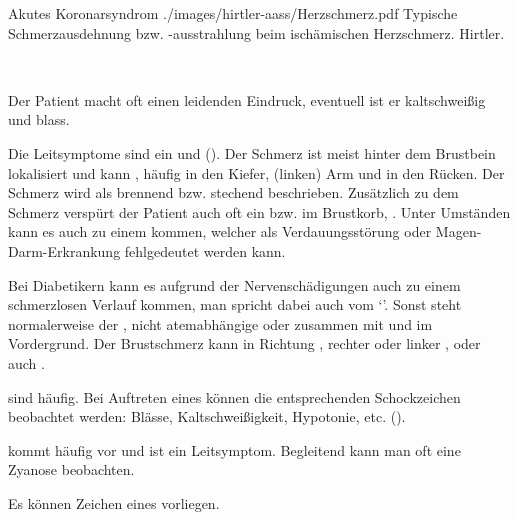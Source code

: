 {Akutes Koronarsyndrom}
{}
{}
{./images/hirtler-aass/Herzschmerz.pdf}
{Typische Schmerzausdehnung bzw. -ausstrahlung beim ischämischen
Herzschmerz.}
{Hirtler.}




{\TxABCDE}
{~
\begin{ABCDEText}
  \item[\ABCDE{3}]  Der Patient macht oft einen leidenden
  Eindruck, eventuell ist er kaltschweißig und blass.
  \item[\ABCDE{4}] Die Leitsymptome sind ein  und 
  ().
  Der Schmerz ist meist hinter dem Brustbein lokalisiert und
  kann , häufig in den Kiefer, (linken) Arm
  und in den Rücken. Der Schmerz wird als brennend bzw.
  stechend beschrieben. Zusätzlich zu dem Schmerz verspürt
  der Patient auch oft ein  bzw. 
  im Brustkorb, .
  Unter Umständen kann es auch zu einem
   kommen, welcher als
  Verdauungsstörung oder Magen-Darm-Erkrankung fehlgedeutet
  werden kann.
  
  Bei Diabetikern kann es aufgrund der Nervenschädigungen
  auch zu einem schmerzlosen Verlauf kommen, man spricht
  dabei auch vom \enquote*{}.
  Sonst steht normalerweise der ,
  nicht atemabhängige  oder
   zusammen mit  und
   im Vordergrund. Der Brustschmerz kann in
  Richtung , rechter oder linker ,
   oder auch  .
  
   sind
  häufig.
  Bei Auftreten eines  können die
  entsprechenden Schockzeichen beobachtet werden: Blässe,
  Kaltschweißigkeit, Hypotonie, etc.
  ().
  \item[\ABCDE{B}]  kommt häufig vor und ist ein
  Leitsymptom.  Begleitend kann man oft eine Zyanose
  beobachten.
  \item[\ABCDE{C}] Es können Zeichen eines  vorliegen. 
  

\end{ABCDEText}}
